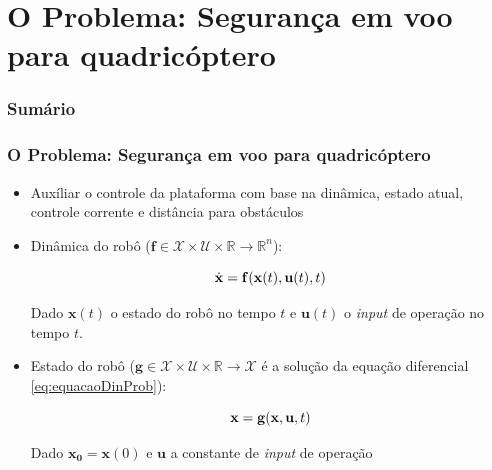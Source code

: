 \documentclass{beamer}
\begin{document}
\section{O Problema: Segurança em voo para quadricóptero}

\begin{frame}
	\frametitle{Sumário}
	\tableofcontents[currentsection]
\end{frame}

\begin{frame}[allowframebreaks]
	\frametitle{O Problema: Segurança em voo para quadricóptero}
	
	\begin{itemize}
		
		\item Auxíliar o controle da plataforma com base na dinâmica, estado  atual, controle corrente e distância para obstáculos
		
		\item Dinâmica do robô ($\mathbf{f} \in \mathcal{X} \times \mathcal{U} \times \mathbb{R} \rightarrow \mathbb{R}^{n}$):
		
		\begin{equation}
		\centering
		\dot{\mathbf{x}} = \mathbf{f}(\mathbf{x}(t),\mathbf{u}(t),t)  
		\label{eq:equacaoDinProb}
		\end{equation}
		
		
		Dado $\mathbf{x}(t)$ o estado do robô no tempo $t$ e $\mathbf{u}(t)$ o \textit{input} de operação no tempo $t$.
		
		
		
		\item Estado do robô ($\mathbf{g} \in \mathcal{X} \times \mathcal{U} \times \mathbb{R} \rightarrow \mathcal{X}$ é a solução da equação diferencial \ref{eq:equacaoDinProb}):
		
		\begin{equation}
		\centering
		\mathbf{x} = \mathbf{g}(\mathbf{x},\mathbf{u},t)  
		\label{eq:equacaoPosProb}
		\end{equation}
	
		Dado $\mathbf{x_0} = \mathbf{x}(0)$ e $\mathbf{u}$ a constante de \textit{input} de operação				
		
	\framebreak
	
		

\end{itemize}
\end{frame}
\end{document}
